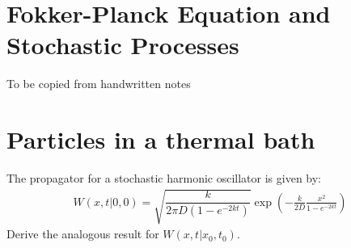 \documentclass[../template.tex]{subfiles}
\begin{document}
\chapter{Fokker-Planck Equation and Stochastic Processes}
To be copied from handwritten notes

\chapter{Particles in a thermal bath} %
\begin{exo}
    The propagator for a stochastic harmonic oscillator is given by:
    \begin{align*}
        W(x,t|0,0) = \sqrt{\dfrac{k}{2 \pi D (1- e^{-2kt})} } \exp\left(-\frac{k}{2D} \frac{x^2}{1-e^{-2kt}}  \right)
    \end{align*}
    Derive the analogous result for $W(x,t|x_0,t_0)$.
    \medskip


\end{exo}
\end{document}
